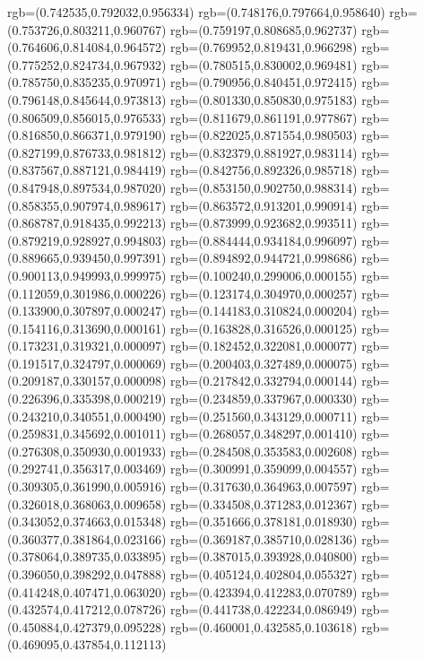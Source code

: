 {{{			rgb=(0.742535,0.792032,0.956334)
			rgb=(0.748176,0.797664,0.958640)
			rgb=(0.753726,0.803211,0.960767)
			rgb=(0.759197,0.808685,0.962737)
			rgb=(0.764606,0.814084,0.964572)
			rgb=(0.769952,0.819431,0.966298)
			rgb=(0.775252,0.824734,0.967932)
			rgb=(0.780515,0.830002,0.969481)
			rgb=(0.785750,0.835235,0.970971)
			rgb=(0.790956,0.840451,0.972415)
			rgb=(0.796148,0.845644,0.973813)
			rgb=(0.801330,0.850830,0.975183)
			rgb=(0.806509,0.856015,0.976533)
			rgb=(0.811679,0.861191,0.977867)
			rgb=(0.816850,0.866371,0.979190)
			rgb=(0.822025,0.871554,0.980503)
			rgb=(0.827199,0.876733,0.981812)
			rgb=(0.832379,0.881927,0.983114)
			rgb=(0.837567,0.887121,0.984419)
			rgb=(0.842756,0.892326,0.985718)
			rgb=(0.847948,0.897534,0.987020)
			rgb=(0.853150,0.902750,0.988314)
			rgb=(0.858355,0.907974,0.989617)
			rgb=(0.863572,0.913201,0.990914)
			rgb=(0.868787,0.918435,0.992213)
			rgb=(0.873999,0.923682,0.993511)
			rgb=(0.879219,0.928927,0.994803)
			rgb=(0.884444,0.934184,0.996097)
			rgb=(0.889665,0.939450,0.997391)
			rgb=(0.894892,0.944721,0.998686)
			rgb=(0.900113,0.949993,0.999975)
			rgb=(0.100240,0.299006,0.000155)
			rgb=(0.112059,0.301986,0.000226)
			rgb=(0.123174,0.304970,0.000257)
			rgb=(0.133900,0.307897,0.000247)
			rgb=(0.144183,0.310824,0.000204)
			rgb=(0.154116,0.313690,0.000161)
			rgb=(0.163828,0.316526,0.000125)
			rgb=(0.173231,0.319321,0.000097)
			rgb=(0.182452,0.322081,0.000077)
			rgb=(0.191517,0.324797,0.000069)
			rgb=(0.200403,0.327489,0.000075)
			rgb=(0.209187,0.330157,0.000098)
			rgb=(0.217842,0.332794,0.000144)
			rgb=(0.226396,0.335398,0.000219)
			rgb=(0.234859,0.337967,0.000330)
			rgb=(0.243210,0.340551,0.000490)
			rgb=(0.251560,0.343129,0.000711)
			rgb=(0.259831,0.345692,0.001011)
			rgb=(0.268057,0.348297,0.001410)
			rgb=(0.276308,0.350930,0.001933)
			rgb=(0.284508,0.353583,0.002608)
			rgb=(0.292741,0.356317,0.003469)
			rgb=(0.300991,0.359099,0.004557)
			rgb=(0.309305,0.361990,0.005916)
			rgb=(0.317630,0.364963,0.007597)
			rgb=(0.326018,0.368063,0.009658)
			rgb=(0.334508,0.371283,0.012367)
			rgb=(0.343052,0.374663,0.015348)
			rgb=(0.351666,0.378181,0.018930)
			rgb=(0.360377,0.381864,0.023166)
			rgb=(0.369187,0.385710,0.028136)
			rgb=(0.378064,0.389735,0.033895)
			rgb=(0.387015,0.393928,0.040800)
			rgb=(0.396050,0.398292,0.047888)
			rgb=(0.405124,0.402804,0.055327)
			rgb=(0.414248,0.407471,0.063020)
			rgb=(0.423394,0.412283,0.070789)
			rgb=(0.432574,0.417212,0.078726)
			rgb=(0.441738,0.422234,0.086949)
			rgb=(0.450884,0.427379,0.095228)
			rgb=(0.460001,0.432585,0.103618)
			rgb=(0.469095,0.437854,0.112113)
}}}

